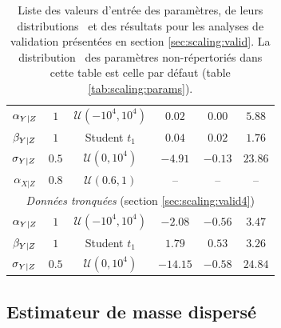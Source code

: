 \begin{table}[t]
\begin{tabular}{c c c c c c}
        \midrule
        $\alpha_{Y|Z}$ & $1   $ & $\mathcal{U}(-10^4, 10^4)$
                       & $0.02$  & $0.00$  & $5.88$ \\
        $\beta_{Y|Z}$  & $1   $ & Student $t_1$
                       & $0.04$  & $0.02$  & $1.76$ \\
        $\sigma_{Y|Z}$ & $0.5 $ & $\mathcal{U}(0, 10^4)$
                       & $-4.91$  & $-0.13$  & $23.86$ \\
        $\alpha_{X|Z}$ & $0.8 $ & $\mathcal{U}(0.6, 1)$ & -- & -- & -- \\
        \midrule
        \multicolumn{6}{c}{\textit{Données tronquées} (section \ref{sec:scaling:valid4})} \\
        \midrule
        $\alpha_{Y|Z}$ & $1   $ & $\mathcal{U}(-10^4, 10^4)$
                       & $-2.08$  & $-0.56$  & $3.47$ \\
        $\beta_{Y|Z}$  & $1   $ & Student $t_1$
                       & $1.79$  & $0.53$  & $3.26$ \\
        $\sigma_{Y|Z}$ & $0.5 $ & $\mathcal{U}(0, 10^4)$
                       & $-14.15$  & $-0.58$  & $24.84$ \\
        \bottomrule
    \end{tabular}
    \caption{%
        Liste des valeurs d'entrée des paramètres, de leurs distributions \prior\ et des résultats pour les analyses de validation présentées en section \ref{sec:scaling:valid}.
        La distribution \prior\ des paramètres non-répertoriés dans cette table est celle par défaut (table \ref{tab:scaling:params}).
    }
    \label{tab:scaling:valid}
\end{table}

\subsection{Estimateur de masse dispersé}
\label{sec:scaling:valid2}

